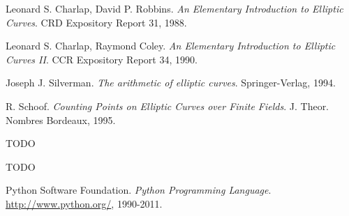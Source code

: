 \begin{thebibliography}{99}

    Leonard S. Charlap, David P. Robbins.
    \emph{An Elementary Introduction to Elliptic Curves}.
    CRD Expository Report 31, 1988.

    Leonard S. Charlap, Raymond Coley.
    \emph{An Elementary Introduction to Elliptic Curves II}.
    CCR Expository Report 34, 1990.

    Joseph J. Silverman.
    \emph{The arithmetic of elliptic curves}.
    Springer-Verlag, 1994.

    R. Schoof.
    \emph{Counting Points on Elliptic Curves over Finite Fields}.
    J. Theor. Nombres Bordeaux, 1995.

    TODO

    TODO

    Python Software Foundation.
    \emph{Python Programming Language}.
    \url{http://www.python.org/}, 1990-2011.

\end{thebibliography}
